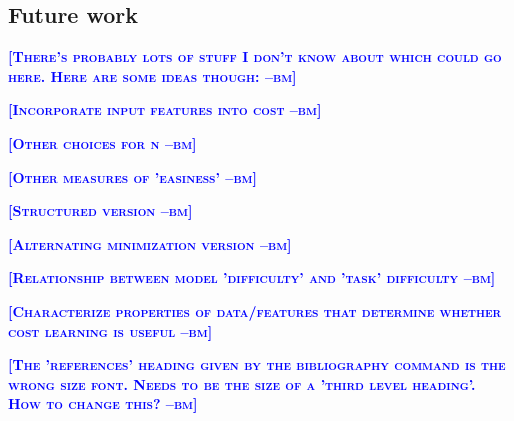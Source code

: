\documentclass{article} %
\newcommand{\bmcomment}[1]{\textcolor{blue}{\textsc{\textbf{[#1 --bm]}}}}
\begin{document}
\subsection{Future work}

\bmcomment{There's probably lots of stuff I don't know about
which could go here.  Here are some ideas though:}

\bmcomment{Incorporate input features into cost}

\bmcomment{Other choices for n}

\bmcomment{Other measures of 'easiness'}

\bmcomment{Structured version}

\bmcomment{Alternating minimization version}

\bmcomment{Relationship between model 'difficulty' and 'task' difficulty}

\bmcomment{Characterize properties of data/features that determine whether cost learning is useful}



\bmcomment{The 'references' heading given by the 
bibliography command is the wrong size font.  Needs to
be the size of a 'third level heading'.  How to change this?}



%
%


\end{document}
